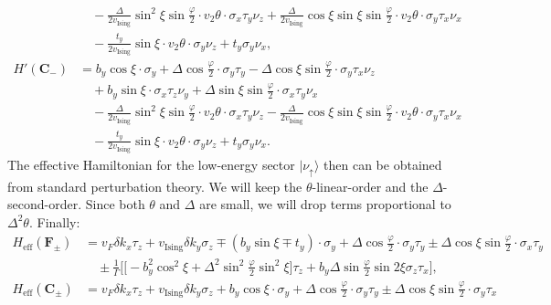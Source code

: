 \begin{subappendices}
\begin{align}
		             & \quad-\frac{\Delta}{2v_{\text{Ising}}}\sin^2\xi\sin\frac{\varphi}{2} \cdot v_2\theta\cdot\sigma_x\tau_y\nu_z+\frac{\Delta}{2v_{\text{Ising}}}\cos\xi\sin\xi \sin\frac{\varphi}{2} \cdot v_2\theta\cdot \sigma_y\tau_x\nu_x\nonumber  \\
		             & \quad-\frac{t_y}{2v_{\text{Ising}}}\sin\xi\cdot v_2\theta\cdot\sigma_y\nu_z+t_y\sigma_y\nu_x,\label{H' for P+}                                                                                                                       \\
		H'(\bm{C}_-) & =b_y\cos\xi\cdot\sigma_y+\Delta\cos\frac{\varphi}{2}\cdot\sigma_y\tau_y-\Delta\cos\xi\sin\frac{\varphi}{2}\cdot\sigma_y\tau_x\nu_z\nonumber                                                                                          \\
		             & \quad+b_y\sin\xi\cdot\sigma_x\tau_z\nu_y+\Delta\sin\xi\sin\frac{\varphi}{2}\cdot\sigma_x\tau_y\nu_x \nonumber                                                                                                                        \\
		             & \quad-\frac{\Delta}{2v_{\text{Ising}}}\sin^2\xi\sin\frac{\varphi}{2} \cdot v_2\theta\cdot\sigma_x\tau_y\nu_z -\frac{\Delta}{2v_{\text{Ising}}}\cos\xi\sin\xi \sin\frac{\varphi}{2} \cdot v_2\theta\cdot \sigma_y\tau_x\nu_x\nonumber \\
		             & \quad-\frac{t_y}{2v_{\text{Ising}}}\sin\xi\cdot v_2\theta\cdot\sigma_y\nu_z+t_y\sigma_y\nu_x.\label{H' for P-}
	\end{align}
	The effective Hamiltonian for the low-energy sector $|\nu_\uparrow\rangle$ then can be obtained from standard perturbation theory. We will keep the $\theta$-linear-order and the $\Delta$-second-order. Since both $\theta$ and $\Delta$ are small, we will drop terms proportional to $\Delta^2\theta$. Finally:
	\begin{align}
		H_{\text{eff}}(\bm{F}_\pm) & =v_F\delta k_x \tau_z+v_{\text{Ising}}\delta k_y \sigma_z\mp (b_y\sin\xi\mp t_y)\cdot\sigma_y+\Delta\cos\frac{\varphi}{2}\cdot\sigma_y\tau_y\pm\Delta\cos\xi\sin\frac{\varphi}{2}\cdot\sigma_x\tau_y\nonumber                   \\
		                           & \quad\pm\frac{1}{\Gamma}\Big[\big[-b_y^2\cos^2\xi+\Delta^2\sin^2\frac{\varphi}{2}\sin^2\xi\big]\tau_z+b_y\Delta\sin\frac{\varphi}{2}\sin 2\xi\sigma_z\tau_x\Big],\label{Heff for Q+ and Q-}                                     \\
		H_{\text{eff}}(\bm{C}_\pm) & =v_F\delta k_x \tau_z+v_{\text{Ising}}\delta k_y \sigma_z+b_y\cos\xi\cdot\sigma_y+\Delta\cos\frac{\varphi}{2}\cdot\sigma_y\tau_y\pm\Delta\cos\xi\sin\frac{\varphi}{2}\cdot\sigma_y\tau_x\nonumber                               \\

\end{align}
\end{subappendices}

